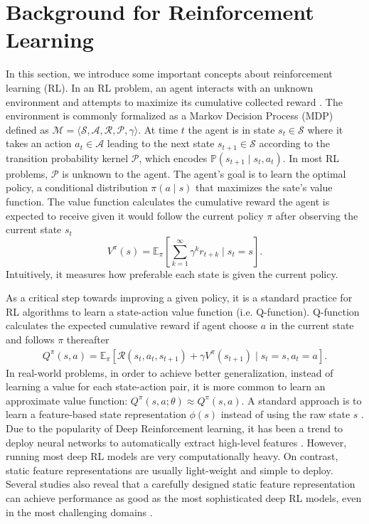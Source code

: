 \documentclass{article}
\begin{document}
\section{Background for Reinforcement Learning}
In this section, we introduce some important concepts about reinforcement learning (RL). In an RL problem, an agent interacts with an unknown environment and attempts to maximize its cumulative collected reward \cite{Sutton98,Szepesvari10}. The environment is commonly formalized as a Markov Decision Process (MDP) defined as $\mathcal{M} = \langle \mathcal{S}, \mathcal{A}, \mathcal{R}, \mathcal{P}, \gamma\rangle$. At time $t$ the agent is in state $s_t \in \mathcal{S}$ where it takes an action $a_t \in \mathcal{A}$ leading to the next state $s_{t+1} \in \mathcal{S}$ according to the transition probability kernel $\mathcal{P}$, which encodes $\mathbb{P}(s_{t+1}\mid s_t,a_t)$. In most RL problems, $\mathcal{P}$ is unknown to the agent. The agent's goal is to learn the optimal policy, a conditional distribution $\pi(a \mid s)$ that  maximizes the sate's value function. The value function calculates the cumulative reward the agent is expected to receive given it would follow the current policy $\pi$ after observing the current state $s_t$
$$
V^\pi(s) = \mathbb{E}_\pi \left[ \sum_{k=1}^\infty \gamma^k r_{t+k} \mid s_t = s   \right].
$$
Intuitively, it measures how preferable each state is given the current policy.

As a critical step towards improving a given policy, it is a standard practice for RL algorithms to learn a state-action value function (i.e. Q-function). Q-function calculates the expected cumulative reward if agent choose $a$ in the current state and follows $\pi$ thereafter
\begin{equation*}
\begin{split}
Q^\pi(s,a) =\mathbb{E}_\pi\left[ \mathcal{R}(s_t,a_t,s_{t+1}) + \gamma V^\pi(s_{t+1}) \mid s_t = s, a_t = a \right].
\end{split}
\end{equation*}
In real-world problems, in order to achieve better generalization, instead of learning a value for each state-action pair, it is more common to learn an approximate value function: $Q^\pi(s,a; \theta) \approx Q^\pi(s,a)$. A standard approach is to learn a feature-based state representation $\phi(s)$ instead of using the raw state $s$ \cite{Gordon00}. Due to the popularity of Deep Reinforcement learning, it has been a trend to deploy neural networks to automatically extract high-level features \cite{Silver17,Mnih15}. However, running most deep RL models are very computationally heavy. On contrast, static feature representations are usually light-weight and simple to deploy. Several studies also reveal that a carefully designed static feature representation can achieve performance as good as the most sophisticated deep RL models, even in the most challenging domains \cite{Liang16}.
\end{document}
